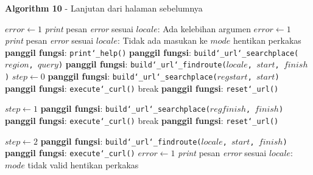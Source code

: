 \begin{algorithm}[h]
	\begin{center}
		\textbf{Algorithm 10} - Lanjutan dari halaman sebelumnya
	\end{center}
	\begin{algorithmic}
			\State $error \gets 1$
			\State \textit{print} pesan \textit{error} sesuai $locale$: Ada kelebihan argumen
		\Else
					\State $error \gets 1$
					\State \textit{print} pesan \textit{error} sesuai $locale$: Tidak ada masukan ke $mode$
					\State hentikan perkakas
				\EndCase
					\State \textbf{panggil fungsi}: \texttt{print\char`_help()}
				\EndCase
					\State \textbf{panggil fungsi}: \texttt{build\char`_url\char`_searchplace($region$, $query$)}
				\EndCase
					\State \textbf{panggil fungsi}: \texttt{build\char`_url\char`_findroute($locale$, $start$, $finish$)}
				\EndCase
					\State $step \gets 0$
					\State \textbf{panggil fungsi}: \texttt{build\char`_url\char`_searchplace($regstart$, $start$)}
					\State \textbf{panggil fungsi}: \texttt{execute\char`_curl()}
						\State break
					\Else
						\State \textbf{panggil fungsi}: \texttt{reset\char`_url()}
					\EndIf
					
					\State $step \gets 1$
					\State \textbf{panggil fungsi}: \texttt{build\char`_url\char`_searchplace($regfinish$, $finish$)}
					\State \textbf{panggil fungsi}: \texttt{execute\char`_curl()}
						\State break
					\Else
						\State \textbf{panggil fungsi}: \texttt{reset\char`_url()}
					\EndIf
					
					\State $step \gets 2$
					\State \textbf{panggil fungsi}: \texttt{build\char`_url\char`_findroute($locale$, $start$, $finish$)}
					\State \textbf{panggil fungsi}: \texttt{execute\char`_curl()}
				\EndCase
				\Default
					\State $error \gets 1$
					\State \textit{print} pesan \textit{error} sesuai $locale$: $mode$ tidak valid
					\State hentikan perkakas
				\EndCase
			\EndSwitch
		\EndIf
		
	\end{algorithmic}
\end{algorithm}
